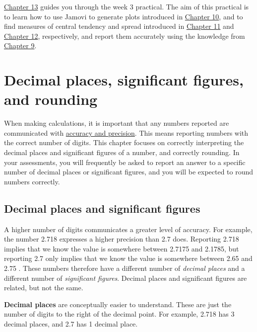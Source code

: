 \documentclass[
]{scrbook}
\begin{document}
\protect\hyperlink{Chapter_13}{Chapter 13} guides you through the week 3 practical.
The aim of this practical is to learn how to use Jamovi to generate plots introduced in \protect\hyperlink{Chapter_10}{Chapter 10}, and to find measures of central tendency and spread introduced in \protect\hyperlink{Chapter_11}{Chapter 11} and \protect\hyperlink{Chapter_12}{Chapter 12}, respectively, and report them accurately using the knowledge from \protect\hyperlink{Chapter_9}{Chapter 9}.

\hypertarget{Chapter_9}{%
\chapter{Decimal places, significant figures, and rounding}\label{Chapter_9}}

When making calculations, it is important that any numbers reported are communicated with \protect\hyperlink{Chapter_6}{accuracy and precision}.
This means reporting numbers with the correct number of digits.
This chapter focuses on correctly interpreting the decimal places and significant figures of a number, and correctly rounding.
In your assessments, you will frequently be asked to report an answer to a specific number of decimal places or significant figures, and you will be expected to round numbers correctly.

\hypertarget{decimal-places-and-significant-figures}{%
\section{Decimal places and significant figures}\label{decimal-places-and-significant-figures}}

A higher number of digits communicates a greater level of accuracy.
For example, the number 2.718 expresses a higher precision than 2.7 does.
Reporting 2.718 implies that we know the value is somewhere between 2.7175 and 2.1785, but reporting 2.7 only implies that we know the value is somewhere between 2.65 and 2.75 \citep{Sokal1995}.
These numbers therefore have a different number of \emph{decimal places} and a different number of \emph{significant figures}.
Decimal places and significant figures are related, but not the same.

\textbf{Decimal places} are conceptually easier to understand. These are just the number of digits to the right of the decimal point. For example, 2.718 has 3 decimal places, and 2.7 has 1 decimal place.
\end{document}
